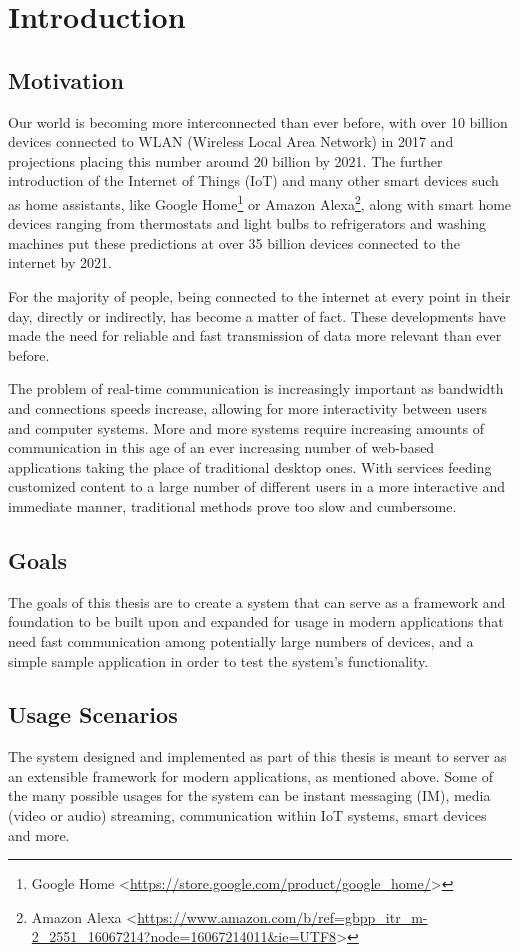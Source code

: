 \chapter{Introduction}

\section{Motivation}

Our world is becoming more interconnected than ever before, with over 10 billion devices connected to WLAN (Wireless Local Area Network) in 2017 and projections placing this number around 20 billion by 2021\cite{devices-on-wlan-2017}. The further introduction of the Internet of Things (IoT) and many other smart devices such as home assistants, like Google Home\footnote{Google Home <\url{https://store.google.com/product/google_home/}>} or Amazon Alexa\footnote{Amazon Alexa <\url{https://www.amazon.com/b/ref=gbpp_itr_m-2_2551_16067214?node=16067214011&ie=UTF8}>}, along with smart home devices ranging from thermostats and light bulbs to refrigerators and washing machines put these predictions at over 35 billion devices connected to the internet by 2021\cite{iot-devices}.

For the majority of people, being connected to the internet at every point in their day, directly or indirectly, has become a matter of fact. These developments have made the need for reliable and fast transmission of data more relevant than ever before.

The problem of real-time communication is increasingly important as bandwidth and connections speeds increase, allowing for more interactivity between users and computer systems. More and more systems require increasing amounts of communication in this age of an ever increasing number of web-based applications taking the place of traditional desktop ones. With services feeding customized content to a large number of different users in a more interactive and immediate manner, traditional methods prove too slow and cumbersome.

\section{Goals}

The goals of this thesis are to create a system that can serve as a framework and foundation to be built upon and expanded for usage in modern applications that need fast communication among potentially large numbers of devices, and a simple sample application in order to test the system's functionality.

\section{Usage Scenarios}

The system designed and implemented as part of this thesis is meant to server as an extensible framework for modern applications, as mentioned above. Some of the many possible usages for the system can be instant messaging (IM), media (video or audio) streaming, communication within IoT systems, smart devices and more.
